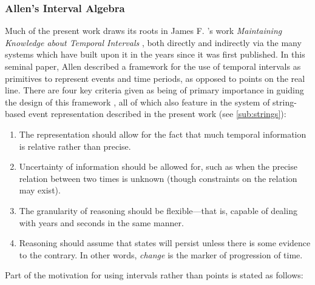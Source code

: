 \documentclass[a4paper,12pt,leqno,twoside]{article}
\begin{document}
\subsubsection{Allen's Interval Algebra}\label{ssub:allen}
Much of the present work draws its roots in James F. \citeauthor{allen1983maintaining}'s work \textit{Maintaining Knowledge about Temporal Intervals} \citeyearpar{allen1983maintaining}, both directly and indirectly via the many systems which have built upon it in the years since it was first published. In this seminal paper, Allen described a framework for the use of temporal intervals as primitives to represent events and time periods, as opposed to points on the real line. There are four key criteria given as being of primary importance in guiding the design of this framework \citeyearpar[p. 833]{allen1983maintaining}, all of which also feature in the system of string-based event representation described in the present work (see \cref{sub:strings}):
\begin{enumerate}\label{other:allen-motivations}
\onehalfspacing
\item The representation should allow for the fact that much temporal information is relative rather than precise.
\item Uncertainty of information should be allowed for, such as when the precise relation between two times is unknown (though constraints on the relation may exist).
\item The granularity of reasoning should be flexible---that is, capable of dealing with years and seconds in the same manner.
\item Reasoning should assume that states will persist unless there is some evidence to the contrary. In other words, \textit{change} is the marker of progression of time. 
\end{enumerate}
Part of the motivation for using intervals rather than points is stated as follows:
\end{document}
